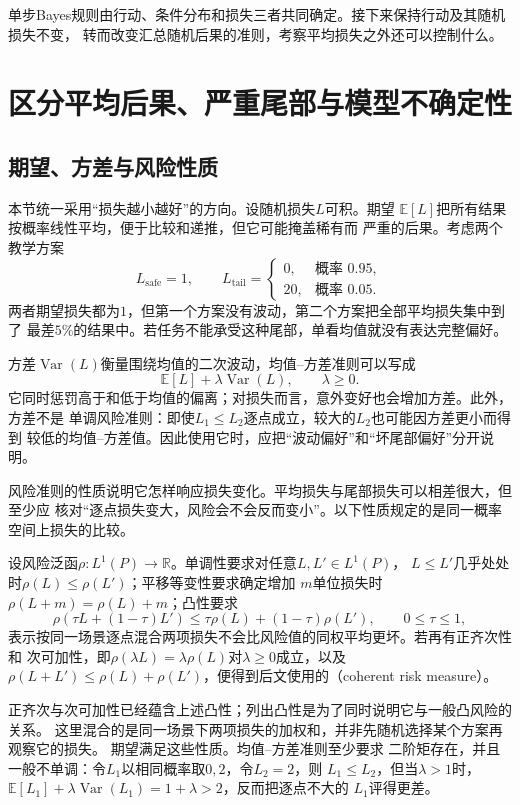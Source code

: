 单步Bayes规则由行动、条件分布和损失三者共同确定。接下来保持行动及其随机损失不变，
转而改变汇总随机后果的准则，考察平均损失之外还可以控制什么。

\section{区分平均后果、严重尾部与模型不确定性}
\label{sec:decision-risk-criteria-robustness}

\subsection{期望、方差与风险性质}
本节统一采用“损失越小越好”的方向。设随机损失\(L\)可积。期望
\(\mathbb{E}[L]\)把所有结果按概率线性平均，便于比较和递推，但它可能掩盖稀有而
严重的后果。考虑两个教学方案
\[
  L_{\mathrm{safe}}=1,
  \qquad
  L_{\mathrm{tail}}
  =
  \begin{cases}
    0,&\text{概率 }0.95,\\
    20,&\text{概率 }0.05.
  \end{cases}
\]
两者期望损失都为\(1\)，但第一个方案没有波动，第二个方案把全部平均损失集中到了
最差\(5\%\)的结果中。若任务不能承受这种尾部，单看均值就没有表达完整偏好。

方差\(\operatorname{Var}(L)\)衡量围绕均值的二次波动，均值--方差准则可以写成
\[
  \mathbb{E}[L]+\lambda\operatorname{Var}(L),
  \qquad \lambda\geq0.
\]
它同时惩罚高于和低于均值的偏离；对损失而言，意外变好也会增加方差。此外，方差不是
单调风险准则：即使\(L_1\leq L_2\)逐点成立，较大的\(L_2\)也可能因方差更小而得到
较低的均值--方差值。因此使用它时，应把“波动偏好”和“坏尾部偏好”分开说明。

风险准则的性质说明它怎样响应损失变化。平均损失与尾部损失可以相差很大，但至少应
核对“逐点损失变大，风险会不会反而变小”。以下性质规定的是同一概率空间上损失的比较。
\begin{definition}[相干风险]
\label{def:decision-coherent-risk}
设风险泛函$\rho:L^1(P)\to\mathbb R$。单调性要求对任意$L,L'\in L^1(P)$，
\(L\leq L'\)几乎处处时\(\rho(L)\leq\rho(L')\)；平移等变性要求确定增加
\(m\)单位损失时\(\rho(L+m)=\rho(L)+m\)；凸性要求
\[
  \rho(\tau L+(1-\tau)L')
  \leq
  \tau\rho(L)+(1-\tau)\rho(L'),
  \qquad 0\leq\tau\leq1,
\]
表示按同一场景逐点混合两项损失不会比风险值的同权平均更坏。若再有正齐次性和
次可加性，即$\rho(\lambda L)=\lambda\rho(L)$对$\lambda\geq0$成立，以及
$\rho(L+L')\leq\rho(L)+\rho(L')$，便得到后文使用的（coherent risk measure）。
\end{definition}
正齐次与次可加性已经蕴含上述凸性；列出凸性是为了同时说明它与一般凸风险的关系。
这里混合的是同一场景下两项损失的加权和，并非先随机选择某个方案再观察它的损失。
期望满足这些性质。均值--方差准则至少要求
二阶矩存在，并且一般不单调：令\(L_1\)以相同概率取\(0,2\)，令\(L_2=2\)，则
\(L_1\leq L_2\)，但当\(\lambda>1\)时，
\(\mathbb{E}[L_1]+\lambda\operatorname{Var}(L_1)=1+\lambda>2\)，反而把逐点不大的
\(L_1\)评得更差。

